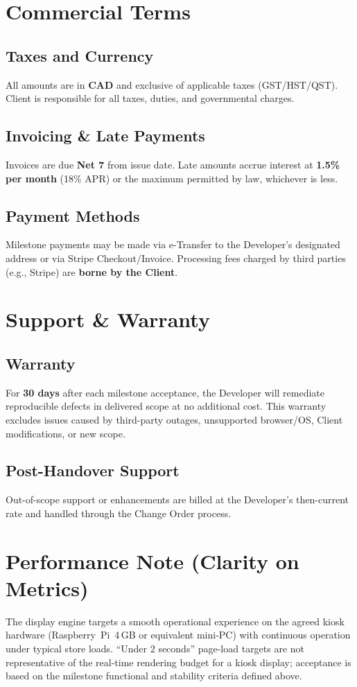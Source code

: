 \documentclass[11pt, a4paper]{article}
\begin{document}
\section{Commercial Terms}
\subsection*{Taxes and Currency}
All amounts are in \textbf{CAD} and exclusive of applicable taxes (GST/HST/QST). Client is responsible for all taxes, duties, and governmental charges.

\subsection*{Invoicing \& Late Payments}
Invoices are due \textbf{Net 7} from issue date. Late amounts accrue interest at \textbf{1.5\% per month} (18\% APR) or the maximum permitted by law, whichever is less.

\subsection*{Payment Methods}
Milestone payments may be made via e-Transfer to the Developer's designated address or via Stripe Checkout/Invoice. Processing fees charged by third parties (e.g., Stripe) are \textbf{borne by the Client}.

\section{Support \& Warranty}
\subsection*{Warranty}
For \textbf{30 days} after each milestone acceptance, the Developer will remediate reproducible defects in delivered scope at no additional cost. This warranty excludes issues caused by third-party outages, unsupported browser/OS, Client modifications, or new scope.

\subsection*{Post-Handover Support}
Out-of-scope support or enhancements are billed at the Developer's then-current rate and handled through the Change Order process.

\section{Performance Note (Clarity on Metrics)}
The display engine targets a smooth operational experience on the agreed kiosk hardware (Raspberry~Pi~4\,GB or equivalent mini-PC) with continuous operation under typical store loads. ``Under 2 seconds'' page-load targets are not representative of the real-time rendering budget for a kiosk display; acceptance is based on the milestone functional and stability criteria defined above.
\end{document}
